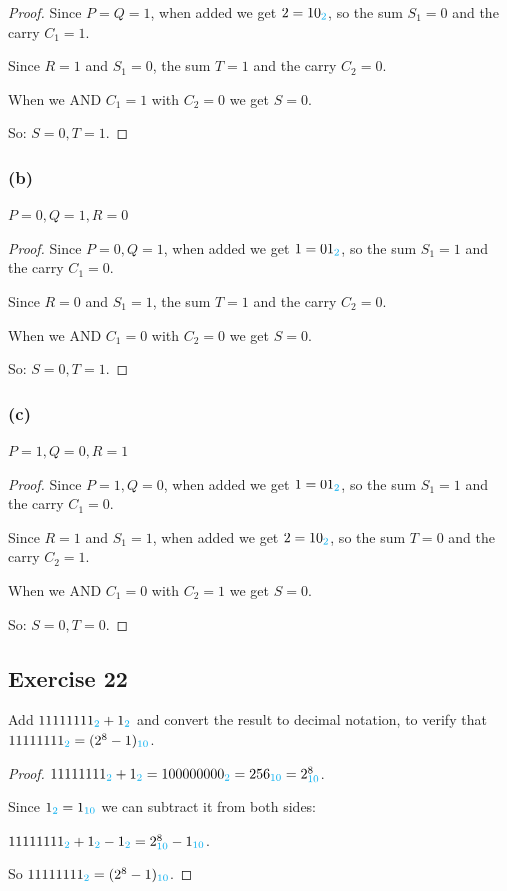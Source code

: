 \documentclass[14pt]{extarticle}
\newcommand{\base}[1]{{\color{cyan}#1}}
\begin{document}
\begin{proof}
Since $P = Q = 1$, when added we get $2 = 10_\base{2}$, so the sum $S_1 = 0$ and the carry $C_1 = 1$.

Since $R = 1$ and $S_1 = 0$, the sum $T = 1$ and the carry $C_2 = 0$.

When we AND $C_1 = 1$ with $C_2 = 0$ we get $S = 0$.

So: $S = 0, T = 1$.
\end{proof}

\subsubsection{(b)}
$P = 0, Q = 1, R = 0$

\begin{proof}
Since $P = 0, Q = 1$, when added we get $1 = 01_\base{2}$, so the sum $S_1 = 1$ and the carry $C_1 = 0$.

Since $R = 0$ and $S_1 = 1$, the sum $T = 1$ and the carry $C_2 = 0$.

When we AND $C_1 = 0$ with $C_2 = 0$ we get $S = 0$.

So: $S = 0, T = 1$.
\end{proof}

\subsubsection{(c)}
$P = 1, Q = 0, R = 1$

\begin{proof}
Since $P = 1, Q = 0$, when added we get $1 = 01_\base{2}$, so the sum $S_1 = 1$ and the carry $C_1 = 0$.

Since $R = 1$ and $S_1 = 1$, when added we get $2 = 10_\base{2}$, so the sum $T = 0$ and the carry $C_2 = 1$.

When we AND $C_1 = 0$ with $C_2 = 1$ we get $S = 0$.

So: $S = 0, T = 0$.
\end{proof}

\subsection{Exercise 22}
Add $11111111_\base{2} + 1_\base{2}$ and convert the result to decimal notation, to verify that \\ $11111111_\base{2} = (2^8 -
1)_\base{10}$.

\begin{proof}
$11111111_\base{2} + 1_\base{2} = 100000000_\base{2} = 256_\base{10} = 2^8_\base{10}$.

Since $1_\base{2} = 1_\base{10}$ we can subtract it from both sides:

$11111111_\base{2} + 1_\base{2} - 1_\base{2} = 2^8_\base{10} - 1_\base{10}$.

So $11111111_\base{2} = (2^8 - 1)_\base{10}$.
\end{proof}
\end{document}
